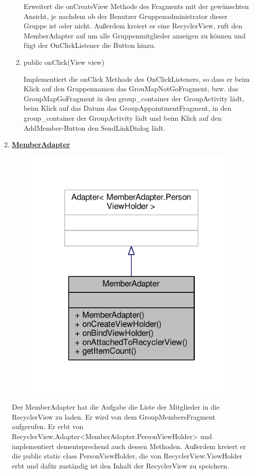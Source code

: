 \begin{enumerate}
\begin{enumerate}
		Erweitert die onCreateView Methode des Fragments mit der gewünschten Ansicht, je nachdem ob der Benutzer Gruppenadministrator dieser Gruppe ist oder nicht. Außerdem kreiert es eine RecyclerView, ruft den MemberAdapter auf um alle Gruppenmitglieder anzeigen zu können und fügt der OnClickListener die Button hinzu.
		
		\item public onClick(View view)
		
		Implementiert die onClick Methode des OnClickListeners, so dass er beim Klick auf den Gruppennamen das GrouMapNotGoFragment, bzw. das GroupMapGoFragment in den group\_container der GroupActivity lädt, beim Klick auf das Datum das GroupAppointmentFragment, in den group\_container der GroupActivity lädt und beim Klick auf den AddMember-Button den SendLinkDialog lädt.
	\end{enumerate}
	\item \textbf{\underline{MemberAdapter}}

	\begin{figure}[H]
		\includegraphics[scale = 1]{res/member_adapter__inherit__graph.pdf}
		\centering
	\end{figure}
	Der MemberAdapter hat die Aufgabe die Liste der Mitglieder in die RecyclerView zu laden. Er wird von dem GroupMembersFragment aufgerufen. Er erbt von RecyclerView.Adapter<MemberAdapter.PersonViewHolder> und implementiert dementsprechend auch dessen Methoden. Außerdem kreiert er die public static class PersonViewHolder, die von RecyclerView.ViewHolder erbt und dafür zuständig ist den Inhalt der RecyclerView zu speichern.


\end{enumerate}
